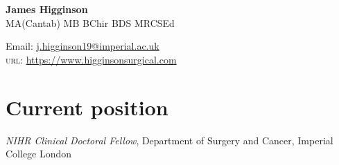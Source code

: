 \documentclass[11pt]{article} %
\begin{document}

{\LARGE\bfseries James Higginson} %
\\{\Large MA(Cantab) MB BChir BDS MRCSEd}
\bigskip\bigskip\medskip %




Email: \href{mailto:j.higginson19@imperial.ac.uk}{j.higginson19@imperial.ac.uk}\\ %
\textsc{url}: \href{https://www.higginsonsurgical.com}{https://www.higginsonsurgical.com}\\ %

\vspace{0.06\textheight} %


\section*{Current position}

\emph{NIHR Clinical Doctoral Fellow}, Department of Surgery and Cancer, Imperial College London%





\end{document}
